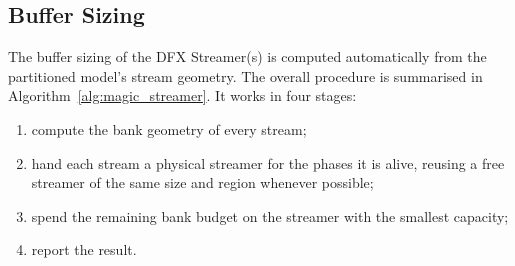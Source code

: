 \documentclass{cernatsnote}
\begin{document}
\subsection{Buffer Sizing} 

The buffer sizing of the DFX Streamer(s) is computed automatically from the partitioned model's stream geometry. The overall procedure is summarised in Algorithm~\ref{alg:magic_streamer}. It works in four stages:

\begin{enumerate}
  \item compute the bank geometry of every stream;
  \item hand each stream a physical streamer for the phases it is alive, reusing a free streamer of the same size and region whenever possible;
  \item spend the remaining bank budget on the streamer with the smallest capacity;
  \item report the result.
\end{enumerate} 
\end{document}
